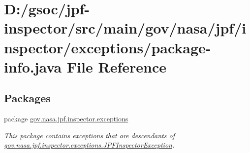\hypertarget{exceptions_2package-info_8java}{}\section{D\+:/gsoc/jpf-\/inspector/src/main/gov/nasa/jpf/inspector/exceptions/package-\/info.java File Reference}
\label{exceptions_2package-info_8java}
\subsection*{Packages}
\begin{DoxyCompactItemize}
\item 
package \hyperlink{namespacegov_1_1nasa_1_1jpf_1_1inspector_1_1exceptions}{gov.\+nasa.\+jpf.\+inspector.\+exceptions}
\begin{DoxyCompactList}\small\item\em This package contains exceptions that are descendants of \hyperlink{classgov_1_1nasa_1_1jpf_1_1inspector_1_1exceptions_1_1_j_p_f_inspector_exception}{gov.\+nasa.\+jpf.\+inspector.\+exceptions.\+J\+P\+F\+Inspector\+Exception}. \end{DoxyCompactList}\end{DoxyCompactItemize}
